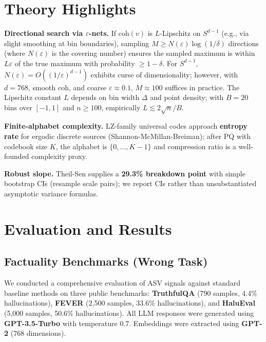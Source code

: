 \documentclass[11pt]{article}
\begin{document}
\section{Theory Highlights}
\label{sec:theory}

\textbf{Directional search via $\varepsilon$-nets.} If $\mathrm{coh}(v)$ is $L$-Lipschitz on $S^{d-1}$ (e.g., via slight smoothing at bin boundaries), sampling $M \ge N(\varepsilon)\log(1/\delta)$ directions (where $N(\varepsilon)$ is the covering number) ensures the sampled maximum is within $L\varepsilon$ of the true maximum with probability $\ge 1-\delta$. For $S^{d-1}$, $N(\varepsilon)=O((1/\varepsilon)^{d-1})$ exhibits curse of dimensionality; however, with $d=768$, smooth $\mathrm{coh}$, and coarse $\varepsilon\approx 0.1$, $M\approx 100$ suffices in practice. The Lipschitz constant $L$ depends on bin width $\Delta$ and point density; with $B=20$ bins over $[-1,1]$ and $n\ge 100$, empirically $L\lesssim 2\sqrt{n}/B$.

\textbf{Finite-alphabet complexity.} LZ-family universal codes approach \textbf{entropy rate} for ergodic discrete sources (Shannon-McMillan-Breiman); after PQ with codebook size $K$, the alphabet is $\{0,\dots,K-1\}$ and compression ratio is a well-founded complexity proxy.

\textbf{Robust slope.} Theil-Sen supplies a \textbf{29.3\% breakdown point} with simple bootstrap CIs (resample scale pairs); we report CIs rather than unsubstantiated asymptotic variance formulas.

\section{Evaluation and Results}
\label{sec:evaluation}

\subsection{Factuality Benchmarks (Wrong Task)}
\label{sec:eval-factuality}

We conducted a comprehensive evaluation of ASV signals against standard baseline methods on three public benchmarks: \textbf{TruthfulQA} (790 samples, 4.4\% hallucinations), \textbf{FEVER} (2,500 samples, 33.6\% hallucinations), and \textbf{HaluEval} (5,000 samples, 50.6\% hallucinations). All LLM responses were generated using \textbf{GPT-3.5-Turbo} with temperature 0.7. Embeddings were extracted using \textbf{GPT-2} (768 dimensions).
\end{document}
